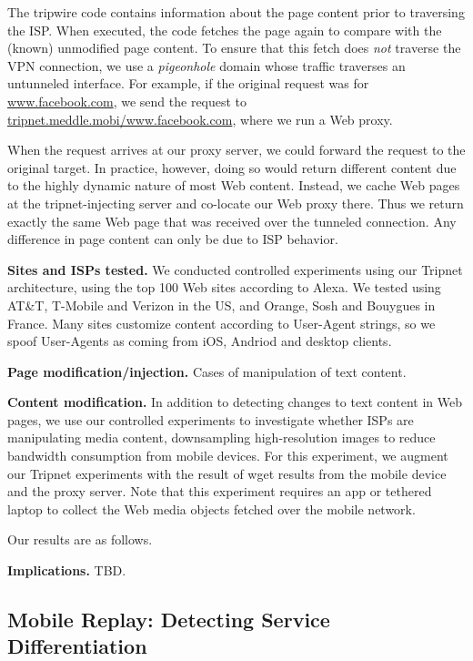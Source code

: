 The tripwire code contains information about the page content prior to traversing the ISP. When 
executed, the code fetches the page again to compare with the (known) unmodified page content.  
To ensure that this fetch does \emph{not} traverse the VPN connection, we use a \emph{pigeonhole} domain 
whose traffic traverses an untunneled interface. For example, if the original request was for \url{www.facebook.com}, 
we send the request to \url{tripnet.meddle.mobi/www.facebook.com}, where we run a Web proxy. 

When the request arrives at our proxy server, we could forward the request to the original target. In 
practice, however, doing so would return different content due to the highly dynamic nature of most 
Web content. Instead, we cache Web pages at the tripnet-injecting server and co-locate our Web proxy 
there. Thus we return exactly the same Web page that was received over the tunneled connection. 
Any difference in page content can only be due to ISP behavior. 


\noindent\textbf{Sites and ISPs tested.} We conducted controlled experiments using our Tripnet 
architecture, using the top 100 Web sites according to Alexa. We tested using 
AT\&T, T-Mobile and Verizon in the US, and Orange, Sosh and Bouygues in France. 
Many sites customize content according to User-Agent strings, so we spoof User-Agents 
as coming from iOS, Andriod and desktop clients.

\noindent\textbf{Page modification/injection.} Cases of manipulation of text content.

\noindent\textbf{Content modification.} In addition to detecting changes to text content in 
Web pages, we use our controlled experiments to investigate whether ISPs are manipulating 
media content, \eg downsampling high-resolution images to reduce bandwidth consumption 
from mobile devices. For this experiment, we augment our Tripnet experiments with the result 
of wget results from the mobile device and the proxy server. Note that this experiment requires an 
app or tethered laptop to collect the Web media objects fetched over the mobile network.

Our results are as follows.

\noindent\textbf{Implications.} TBD.


\subsection{Mobile Replay: Detecting Service Differentiation}

